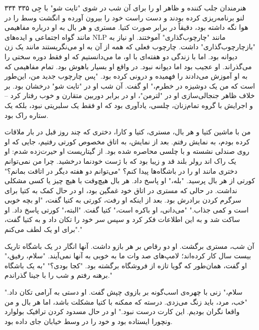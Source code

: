 ۳۳۴  
۳۳۵  
هنرمندان جلب کننده و ظاهر او را برای آن شب در شوی "تایت شو" با جِی لنو برنامه‌ریزی کرده بودند و دست راست خود را بیرون آورده و انگشت وسط را در هوا نگه داشته بود، دقیقاً در برابر صورت کتیا. مستری و هر بال به او درباره مفاهیمی مانند گواه اجتماعی و ایده‌های NLP مانند "چارچوب‌گذاری" آموختند. او نیاز به "بازچارچوب‌گذاری" داشت. چارچوب فعلی که همه از آن به او می‌نگریستند مانند یک زن دیوانه بود. اما با زندگی دو هفته‌ای با او، ما می‌دانستیم که او فقط دوره سختی را می‌گذراند. او عجیب بود اما دیوانه نبود. در واقع او بسیار باهوش بود. تمام مفاهیمی که به او آموزش می‌دادند را فهمیده و درونی کرده بود.  
"پس چارچوب جدید من، این‌طور است که من یک دوشیزه در خطرم،" او گفت. آن شب او در "تایت شو" درخشان بود. بر خلاف ظاهر جنجالی‌سازی او در "لترمن"، او در برابر دوربین متقارن و خوب رفتار کرد -- و اجرایش با گروه تمام‌زنان، چلسی، یادآوری بود که او فقط یک سلبریتی نبود، بلکه یک ستاره راک بود.  

من با ماشین کتیا و هر بال، مستری، کتیا و کارا، دختری که چند روز قبل در بار ملاقات کرده بودم، به نمایش رفتم. بعد از نمایش، به اتاق مخصوص کورتی رفتیم، جایی که او روی صندلی نشسته و با چلسی محاصره شده بود. از گیتاریست او حیرت‌زده شدم: او یک راک اند رولر بلند قد و زیبا بود که با ژست خودنما درخشید. چرا من نمی‌توانم دختری مانند او را در باشگاه‌ها پیدا کنم؟  
"می‌توانم دو هفته دیگر در اتاقت بمانم؟" کورتی از هر بال پرسید.  
"بله،" او پاسخ داد. هر بال هیچ‌وقت با هیچ چیز یا کسی مشکلی نداشت. در حالی که مستری در اتاق خود غمگین بود، او در حال کمک به کتیا برای سرگرم کردن برادرش بود. بعد از اینکه او رفت، کورتی به کتیا گفت، "او بچه خوبی است و کمی جذاب."  
"می‌دانی، او باکره است،" کتیا گفت.  
"البته،" کورتی پاسخ داد. او ساکت شد و به این اطلاعات فکر کرد و سپس سر خود را تکان داد و به کتیا گفت، "برای او یک لطف می‌کنم."  

آن شب، مستری برگشت. او دو رقاص بر هر بازو داشت. آنها انگار در یک باشگاه تاریک بیست سال کار کرده‌اند؛ لامپ‌های صد وات ما به خوبی به آنها نمی‌آیند.  
"سلام، رفیق،" او گفت، همان‌طور که گویا تازه از فروشگاه برگشته بود.  
"کجا بودی؟"
"به یک باشگاه برهنه رفتم و شب را با جینا گذراندم."  

"سلام،" زنی با چهره‌ی اسب‌گونه بر بازوی چپش گفت. او دستی به آرامی تکان داد.
"خب، مرد، باید زنگ می‌زدی. درسته که ممکنه با کتیا مشکلت باشد، اما هر بال و من واقعا نگران بودیم. این کارت درست نبود."  
او در حال مسدود کردن ترافیک بولوارد ونچورا ایستاده بود و خود را در وسط خیابان جای داده بود.